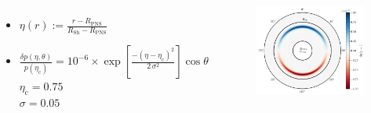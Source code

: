 \documentclass{beamer}
\newcommand{\rpns}{R_{\mathrm{PNS}}}
\newcommand{\rsh}{R_{\mathrm{Sh}}}
\begin{document}
\begin{frame}

  \begin{columns}[c]


      \begin{itemize}
        \item[]
          $\eta\left(r\right):=\frac{r-\rpns}{\rsh-\rpns}$ \\[1em]
        \item[]
          $\frac{\delta p\left(\eta,\theta\right)}
                {p\left(\eta_{\mathrm{c}}\right)}
          =10^{-6}\times
           \exp\left[\frac{-\left(\eta-\eta_{\mathrm{c}}\right)^{2}}
                          {2\,\sigma^{2}}\right]
           \cos\theta$ \\ [1em]
          $\eta_{\mathrm{c}}=0.75$ \\ [1em]
          $\sigma=0.05$
      \end{itemize}


      \begin{figure}[htb!]
        \centering
        \includegraphics[width=\textwidth]{pert.png}
      \end{figure}

  \end{columns}

\end{frame}
\end{document}

